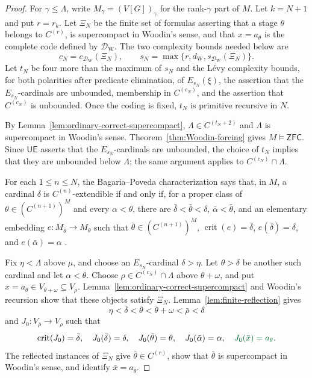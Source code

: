\documentclass[11pt,a4paper]{amsart}
\newcommand{\ZFC}{\mathsf{ZFC}}
\newcommand{\crit}{\operatorname{crit}}
\newcommand{\UE}{\mathsf{UE}}
\theoremstyle{plain}
\theoremstyle{definition}
\theoremstyle{remark}
\begin{document}
\begin{proof}
For $\gamma\leq\Lambda$, write $M_\gamma=(V[G])_\gamma$ for the rank-$\gamma$ part of $M$.  Let $k=N+1$ and put $r=r_k$.  Let $\Xi_N$ be the finite set of formulas asserting that a stage $\theta$ belongs to $C^{(r)}$, is supercompact in Woodin's sense, {\color{auditgreen}and that $x=a_\theta$ is the complete code defined by $\mathcal D_{\mathrm W}$.}  The two complexity bounds needed below are
\[
c_N=c_{\mathcal D_{\mathrm W}}(\Xi_N),\qquad
s_N=\max\{r,d_{\mathrm W},s_{\mathcal D_{\mathrm W}}(\Xi_N)\}.
\]
Let $t_N$ be four more than the maximum of $s_N$ and {\color{auditgreen}the L\'evy complexity bounds, for both polarities after predicate elimination, of $E_{s_N}(\xi)$, the assertion that the $E_{s_N}$-cardinals are unbounded, membership in $C^{(c_N)}$, and the assertion that $C^{(c_N)}$ is unbounded.}  Once the coding is fixed, $t_N$ is primitive recursive in $N$.

By Lemma~\ref{lem:ordinary-correct-supercompact}, $\Lambda\in C^{(t_N+2)}$ and $\Lambda$ is supercompact in Woodin's sense.  Theorem~\ref{thm:Woodin-forcing} gives $M\models\ZFC$.  Since $\UE$ asserts that the $E_{s_N}$-cardinals are unbounded, the choice of $t_N$ implies that they are unbounded below $\Lambda$; the same argument applies to $C^{(c_N)}\cap\Lambda$.

For each $1\leq n\leq N$, the Bagaria--Poveda characterization says that, in $M$, a cardinal $\delta$ is $C^{(n)}$-extendible if and only if, for a proper class of $\theta\in(C^{(n+1)})^M$ and every $\alpha<\theta$, there are $\bar\delta<\bar\theta<\delta$, $\bar\alpha<\bar\theta$, and an elementary embedding $e:M_{\bar\theta}\to M_\theta$ such that $\bar\theta\in(C^{(n+1)})^M$, $\crit(e)=\bar\delta$, $e(\bar\delta)=\delta$, and $e(\bar\alpha)=\alpha$ \cite[Corollary~2.7]{BagariaPoveda}.

Fix $\eta<\Lambda$ above $\mu$, and choose an $E_{s_N}$-cardinal $\delta>\eta$.  Let $\theta>\delta$ be another such cardinal and let $\alpha<\theta$.  Choose $\rho\in C^{(c_N)}\cap\Lambda$ above $\theta+\omega$, {\color{auditgreen}and put $x=a_\theta\in V_{\theta+\omega}\subseteq V_\rho$.}  Lemma~\ref{lem:ordinary-correct-supercompact} and Woodin's recursion show that these objects satisfy $\Xi_N$.  Lemma~\ref{lem:finite-reflection} gives
\[
\eta<\bar\delta<\bar\theta<\bar\theta+\omega<\bar\rho<\delta
\]
and $J_0:V_{\bar\rho}\to V_\rho$ such that
\[
\crit(J_0)=\bar\delta,\quad J_0(\bar\delta)=\delta,\quad
J_0(\bar\theta)=\theta,\quad J_0(\bar\alpha)=\alpha,
{\color{auditgreen}\quad J_0(\bar x)=a_\theta.}
\]
{\color{auditgreen}The reflected instances of $\Xi_N$ give $\bar\theta\in C^{(r)}$, show that $\bar\theta$ is supercompact in Woodin's sense, and identify $\bar x=a_{\bar\theta}$.}


\end{proof}
\end{document}
